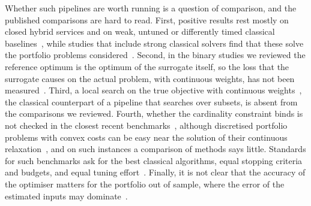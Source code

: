Whether such pipelines are worth running is a question of comparison, and the published comparisons are hard to read.
First, positive results rest mostly on closed hybrid services and on weak, untuned or differently timed classical
baselines~\cite{mugel2022dynamic,lang2022strategic,kim2025quantum}, while studies that include strong classical
solvers find that these solve the portfolio problems considered~\cite{lozano2026where,stopfer2025quantum,chen2025benchmarking}.
Second, in the binary studies we reviewed the reference optimum is the optimum of the surrogate itself, so the loss
that the surrogate causes on the actual problem, with continuous weights, has not been
measured~\cite{brandhofer2022benchmarking,lozano2026where,lozano2026penalty}. Third, a local search on the true
objective with continuous weights~\cite{schaerf2002local,digaspero2011hybrid}, the classical counterpart of a pipeline that searches over
subsets, is absent from the comparisons we reviewed. Fourth, whether the cardinality constraint binds is not checked in
the closest recent benchmarks~\cite{mancilla2026constrained,lozano2026where,lozano2026penalty}, although discretised
portfolio problems with convex costs can be easy near the solution of their continuous
relaxation~\cite{rubiogarcia2022portfolio}, and on such instances a comparison of methods says little. Standards for
such benchmarks ask for the best classical algorithms, equal stopping criteria and budgets, and equal tuning
effort~\cite{barr1995designing,ronnow2014defining,dunning2018what,bucher2024towards,koch2026quantum}.
Finally, it is not clear that the accuracy of the optimiser matters for the portfolio out of sample, where the error
of the estimated inputs may dominate~\cite{michaud1989markowitz,gilli2011optimal}.

